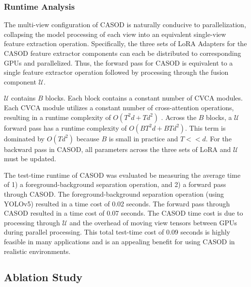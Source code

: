 \subsubsection{Runtime Analysis}
The multi-view configuration of CASOD is naturally conducive to parallelization, collapsing the model processing of each view into an equivalent single-view feature extraction operation. Specifically, the three sets of LoRA Adapters for the CASOD feature extractor components can each be distributed to corresponding GPUs and parallelized. Thus, the forward pass for CASOD is equivalent to a single feature extractor operation followed by processing through the fusion component $\mathcal{U}$.

$\mathcal{U}$ contains $B$ blocks. Each block contains a constant number of CVCA modules. Each CVCA module utilizes a constant number of cross-attention operations, resulting in a runtime complexity of $O(T^2 d + T d^2)$ \cite{vaswani2017attention}. Across the $B$ blocks, a $\mathcal{U}$ forward pass has a runtime complexity of $O(B T^2 d + B T d^2)$. This term is dominated by $O(T d^2)$ because $B$ is small in practice and $T << d$. For the backward pass in CASOD, all parameters across the three sets of LoRA and $\mathcal{U}$ must be updated.

The test-time runtime of CASOD was evaluated be measuring the average time of 1) a foreground-background separation operation, and 2) a forward pass through CASOD. The foreground-background separation operation (using YOLOv5) resulted in a time cost of 0.02 seconds. The forward pass through CASOD resulted in a time cost of 0.07 seconds. The CASOD time cost is due to processing through $\mathcal{U}$ and the overhead of moving view tensors between GPUs during parallel processing. This total test-time cost of 0.09 seconds is highly feasible in many applications and is an appealing benefit for using CASOD in realistic environments.

\subsection{Ablation Study}
\label{sec:casod_disc-ablation}



